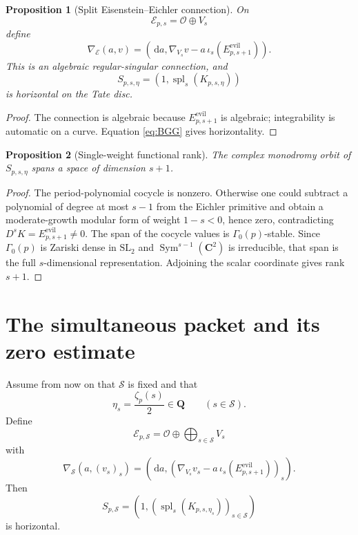 \documentclass[11pt]{article}
\newtheorem{proposition}[proposition]{Proposition}
\theoremstyle{definition}
\theoremstyle{remark}
\newcommand{\Q}{\mathbf Q}
\newcommand{\C}{\mathbf C}
\newcommand{\dd}{\,\mathrm d}
\newcommand{\Sym}{\operatorname{Sym}}
\newcommand{\calE}{\mathcal E}
\newcommand{\calO}{\mathcal O}
\begin{document}
\begin{proposition}[Split Eisenstein--Eichler connection]
\label{prop:block-connection}
On
\[
 \calE_{p,s}=\calO\oplus V_s
\]
define
\begin{equation}\label{eq:block-connection}
 \nabla_{\calE}(a,v)=
 \left(\dd a,\nabla_{V_s}v-a\,\iota_s(E_{p,s+1}^{\mathrm{evil}})\right).
\end{equation}
This is an algebraic regular-singular connection, and
\begin{equation}\label{eq:block-leaf}
 S_{p,s,\eta}=(1,\operatorname{spl}_s(K_{p,s,\eta}))
\end{equation}
is horizontal on the Tate disc.
\end{proposition}

\begin{proof}
The connection is algebraic because $E_{p,s+1}^{\mathrm{evil}}$ is algebraic;
integrability is automatic on a curve.  Equation \eqref{eq:BGG} gives
horizontality.
\end{proof}

\begin{proposition}[Single-weight functional rank]\label{prop:block-rank}
The complex monodromy orbit of $S_{p,s,\eta}$ spans a space of dimension
$s+1$.
\end{proposition}

\begin{proof}
The period-polynomial cocycle is nonzero.  Otherwise one could subtract a
polynomial of degree at most $s-1$ from the Eichler primitive and obtain a
moderate-growth modular form of weight $1-s<0$, hence zero, contradicting
$D^sK=E_{p,s+1}^{\mathrm{evil}}\ne0$.  The span of the cocycle values is
$\Gamma_0(p)$-stable.  Since $\Gamma_0(p)$ is Zariski dense in
$\mathrm{SL}_2$ and $\Sym^{s-1}(\C^2)$ is irreducible, that span is the full
$s$-dimensional representation.  Adjoining the scalar coordinate gives rank
$s+1$.
\end{proof}

\section{The simultaneous packet and its zero estimate}\label{sec:simultaneous}

Assume from now on that $\mathcal S$ is fixed and that
\begin{equation}\label{eq:joint-rationality}
 \eta_s=\frac{\zeta_p(s)}2\in\Q
 \qquad(s\in\mathcal S).
\end{equation}
Define
\begin{equation}\label{eq:sim-connection}
 \calE_{p,\mathcal S}=\calO\oplus\bigoplus_{s\in\mathcal S}V_s
\end{equation}
with
\begin{equation}\label{eq:sim-connection-formula}
 \nabla_{\mathcal S}(a,(v_s)_s)=
 \left(\dd a,
 \left(\nabla_{V_s}v_s-a\,\iota_s(E_{p,s+1}^{\mathrm{evil}})\right)_s
 \right).
\end{equation}
Then
\begin{equation}\label{eq:sim-leaf}
 S_{p,\mathcal S}=
 \left(1,(\operatorname{spl}_s(K_{p,s,\eta_s}))_{s\in\mathcal S}\right)
\end{equation}
is horizontal.
\end{document}
